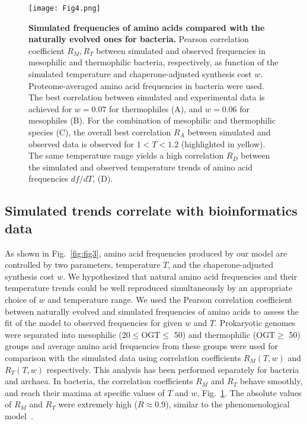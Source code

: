 \documentclass[10pt,letterpaper]{article}
\begin{document}
\begin{figure}[h!]
\texttt{[image: Fig4.png]}
\caption{
{\bf Simulated frequencies of amino acids compared with the naturally evolved ones for bacteria.} 
Pearson correlation coefficient $R_M, R_T$ between simulated and observed frequencies in mesophilic and thermophilic bacteria, respectively, as function of the simulated temperature and chaperone-adjusted synthesis cost $w$. Proteome-averaged amino acid frequencies in bacteria were used. The best correlation between simulated and experimental data is achieved for $w=0.07$ for thermophiles (A), and $w=0.06$ for mesophiles (B). For the combination of mesophilic and thermophilic species (C), the overall best correlation $R_A$ between simulated and observed data is observed for $1<T<1.2$ (highlighted in yellow). The same temperature range yields a high correlation $R_D$ between the simulated and observed temperature trends of amino acid frequencies $df/dT$, (D).
}
\label{fig:fig4}
\end{figure}

\subsection*{Simulated trends correlate with bioinformatics data}

As shown in Fig.~\ref{fig:fig3}, amino acid frequencies produced by our model are controlled by two parameters, temperature $T$, and the chaperone-adjusted synthesis cost $w$. We hypothesized that natural amino acid frequencies and their temperature trends could be well reproduced simultaneously by an appropriate choice of $w$ and temperature range. We used the Pearson correlation coefficient between naturally evolved and simulated frequencies of amino acids to assess the fit of the model to observed frequencies for given $w$ and $T$. Prokaryotic genomes were separated into mesophilic (20$\leq$OGT$\leq$ 50\textcelsius) and thermophilic (OGT$\geq$ 50\textcelsius) groups and average amino acid frequencies from these groups were used for comparison with the simulated data using correlation coefficients $R_M(T,w)$ and $R_T(T,w)$ respectively. This analysis has been performed separately for bacteria and archaea. In bacteria, the correlation coefficients $R_M$ and $R_T$ behave smoothly, and reach their maxima at specific values of $T$ and $w$, Fig.~\ref{fig:fig4}. The absolute values of $R_M$ and $R_T$ were extremely high ($R\approx0.9$), similar to the phenomenological model~\cite{Krick2014Amino}. 
\end{document}
